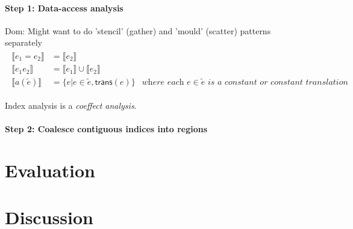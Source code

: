 \documentclass[10pt]{sigplanconf}
\newcommand{\dnote}[1]{\textcolor{darkpurple}{Dom: #1}}
\theoremstyle{definition}
\newcommand{\interp}[1]{\llbracket{#1}\rrbracket}
\begin{document}
\paragraph{Step 1: Data-access analysis}

\dnote{Might want to do 'stencil' (gather) and 'mould' (scatter)
  patterns separately}
\begin{align*}
\begin{array}{lll}
\interp{e_1 = e_2}    & = \interp{e_2} \\
\interp{e_1 e_2}      & = \interp{e_1} \cup \interp{e_2} \\
\interp{a(\tilde{e})} & = \{e | e \in \tilde{e}, \textsf{trans}(e)\} & \textit{where each $e \in
                                          \tilde{e}$ is a constant or constant translation}
\end{array}
\end{align*}

Index analysis is a \emph{coeffect analysis}.

\paragraph{Step 2: Coalesce contiguous indices into regions}


\section{Evaluation}

\section{Discussion}



\end{document}

